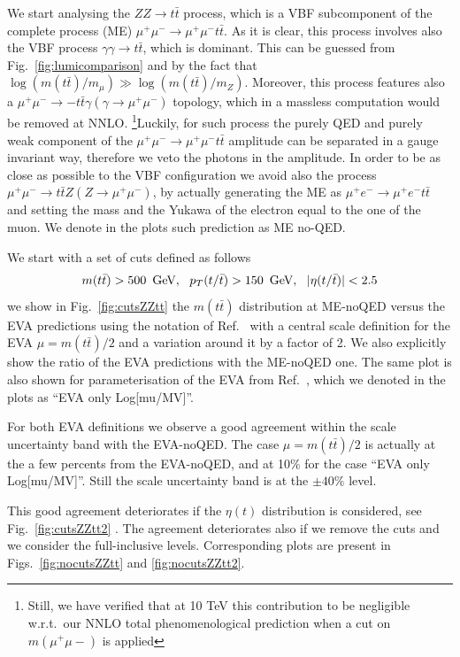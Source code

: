 \documentclass[a4paper,11pt]{article}
\begin{document}
We start analysing the $ZZ\to t \bar t$ process, which is a VBF subcomponent of the complete process (ME) $\mu^+\mu^-\to\mu^+\mu^- t \bar t$. As it is clear, this process involves also the VBF process $\gamma \gamma \to t \bar t$, which is dominant. This can be guessed from Fig.~\ref{fig:lumicomparison} and by the fact that $\log(m(t\bar t)/m_\mu)\gg \log(m(t\bar t)/m_Z)$. Moreover, this process features also a $\mu^+\mu^-\to- t \bar t \gamma (\gamma \to\mu^+\mu^-)$ topology, which in a massless computation would be removed at NNLO. \footnote{Still, we have verified that at 10 TeV this contribution to be negligible w.r.t.~our NNLO total phenomenological prediction when a cut on $m(\mu^+ \mu-)$ is applied }Luckily, for such process the purely QED and purely weak component of the $\mu^+\mu^-\to\mu^+\mu^- t \bar t$ amplitude can be separated in a gauge invariant way, therefore we veto the photons in the amplitude. In order to be as close as possible to the VBF configuration we avoid also the process $\mu^+\mu^-\to t \bar t Z (Z \to\mu^+\mu^- )$, by actually generating the ME as $\mu^+e^-\to\mu^+e^- t \bar t$ and setting the mass and the Yukawa of the electron equal to the one of the muon. We denote in the plots such prediction as ME no-QED.

We start with a set of cuts defined as follows
%
\begin{equation}
m(t \bar t) > 500~\,\textrm{GeV},~~ p_T(t/ \bar t) > 150~\,\textrm{GeV},~~ |\eta(t/\bar t)|<2.5 
\end{equation}
%
we show in Fig.~\ref{fig:cutsZZtt} the $m(t \bar t)$ distribution at ME-noQED versus the EVA predictions using the notation of Ref.~\cite{Garosi:2023bvq} with a central scale definition for the EVA $\mu=m(t \bar t) /2$ and a variation around it by a factor of 2.
We also explicitly  show the ratio of the EVA predictions with the ME-noQED one. The same plot is also shown for parameterisation of the EVA from Ref.~\cite{Ruiz:2021tdt}, which we denoted in the plots as ``EVA only Log[mu/MV]''.

For both EVA definitions we observe a good agreement within the scale uncertainty band with the EVA-noQED. The case $\mu=m(t \bar t)/2$ is actually at the a few percents from the  EVA-noQED, and at 10\% for the case  ``EVA only Log[mu/MV]''. Still the scale uncertainty band is at the $\pm40\%$ level.

This good agreement deteriorates if the $\eta(t)$ distribution is considered, see Fig.~\ref{fig:cutsZZtt2} .  
The agreement deteriorates also if we remove the cuts and we consider the full-inclusive levels. Corresponding plots are present in Figs.~\ref{fig:nocutsZZtt} and \ref{fig:nocutsZZtt2}. 
\end{document}
